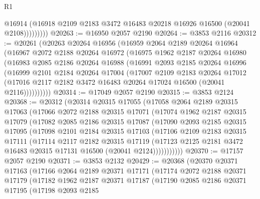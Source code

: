 \begin{lexlean}{R1}
\begin{coremodule}
                  @16914
                  (@16918 @2109 @2183 @3472 @16483 @20218 @16926 @16500 (@20041 @2108)))))))))
@20263 := @16950 @2057 @2190
@20264 := @3853 @2116
@20312 := @20261
    (@20263
      @20264
      @16956
      (@16959
        @2064
        @2189
        @20264
        @16964
        (@16967
          @2072
          @2188
          @20264
          @16972
          (@16975
            @1962
            @2187
            @20264
            @16980
            (@16983
              @2085
              @2186
              @20264
              @16988
              (@16991
                @2093
                @2185
                @20264
                @16996
                (@16999
                  @2101
                  @2184
                  @20264
                  @17004
                  (@17007
                    @2109
                    @2183
                    @20264
                    @17012
                    (@17016 @2117 @2182 @3472 @16483 @20264 @17024 @16500 (@20041 @2116))))))))))
@20314 := @17049 @2057 @2190
@20315 := @3853 @2124
@20368 := @20312
    (@20314
      @20315
      @17055
      (@17058
        @2064
        @2189
        @20315
        @17063
        (@17066
          @2072
          @2188
          @20315
          @17071
          (@17074
            @1962
            @2187
            @20315
            @17079
            (@17082
              @2085
              @2186
              @20315
              @17087
              (@17090
                @2093
                @2185
                @20315
                @17095
                (@17098
                  @2101
                  @2184
                  @20315
                  @17103
                  (@17106
                    @2109
                    @2183
                    @20315
                    @17111
                    (@17114
                      @2117
                      @2182
                      @20315
                      @17119
                      (@17123 @2125 @2181 @3472 @16483 @20315 @17131 @16500 (@20041 @2124)))))))))))
@20370 := @17157 @2057 @2190
@20371 := @3853 @2132
@20429 := @20368
    (@20370
      @20371
      @17163
      (@17166
        @2064
        @2189
        @20371
        @17171
        (@17174
          @2072
          @2188
          @20371
          @17179
          (@17182
            @1962
            @2187
            @20371
            @17187
            (@17190
              @2085
              @2186
              @20371
              @17195
              (@17198
                @2093
                @2185

\end{coremodule}
\end{lexlean}

